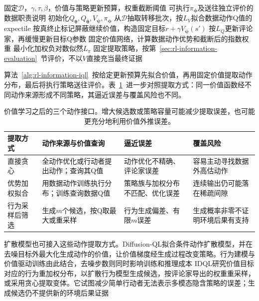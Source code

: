 \begin{algorithm}[固定经验上的IQL与策略提取]
  \label{alg:rl-information-iql}
  \begin{algorithmic}[1]
    \Require 固定$\mathcal D$，$\gamma,\tau,\beta$，价值与策略更新预算，权重截断阈值
    \Ensure 可执行$\pi_{\bm\phi}$及送往独立评价的数据职责说明
    \State 初始化$Q_{\bm\theta},Q_{\bar{\bm\theta}},V_{\bm\psi},\pi_{\bm\phi}$
      \State 从$\mathcal D$抽取转移批次，按$L_V$拟合数据动作Q值的expectile
      \State 按真终止标记屏蔽继续价值，构造固定目标$r+\gamma V_{\bm\psi}(s')$
      \State 按$L_Q$更新评论家，再缓慢更新目标Q参数
    \EndFor
      \State 固定价值网络，计算数据动作优势和截断后的指数权重
      \State 最小化加权负对数似然$L_\pi$
    \EndFor
    \State 固定提取策略，按第~\ref{sec:rl-information-evaluation}~节评价，不以$V$直接充当最终证据
  \end{algorithmic}
\end{algorithm}

算法~\ref{alg:rl-information-iql}~按给定更新预算先拟合价值，再用固定价值提取动作分布，最后将执行策略送往评价。表~\ref{tab:rl-information-extraction}~进一步对照提取方式：同一价值函数经不同动作来源形成不同策略，其逼近误差与覆盖风险也不同。

\begin{table}[htbp]
  \centering
  \small
  \begin{tabularx}{\linewidth}{p{26mm}XXX}
    \toprule
    提取方式 & 动作来源与价值查询 & 逼近误差 & 覆盖风险 \\
    \midrule
    直接贪心 & 全动作优化或行动者提出动作；查询其Q值 & 动作优化不精确、评论家误差 & 容易主动寻找数据外高估动作 \\
    优势加权拟合 & 用数据动作训练执行分布；训练查询数据Q值 & 策略族与加权分布不匹配、优化误差 & 连续输出仍可能落在稀疏间隙 \\
    行为采样后筛选 & 生成$m$个候选，按Q取最大或重采样 & 行为生成偏差、有限$m$误差 & 生成概率非零不证明环境后果有支持 \\
    \bottomrule
  \end{tabularx}
  \caption{价值学习之后的三个动作接口。增大候选数或策略容量可能减少提取误差，也可能更充分地利用价值外推误差。}
  \label{tab:rl-information-extraction}
\end{table}

扩散模型也可接入这些动作提取方式。Diffusion-QL拟合条件动作扩散模型，并在去噪目标外最大化生成动作的价值，让价值梯度经生成过程改变策略。行为建模与价值驱动训练由此结合，去噪步数则同时影响训练和推理成本
IDQL研究价值目标对应的行为重加权分布，以扩散行为模型生成候选，按评论家导出的权重重采样，或采用贪心提取变体。它试图减少简单行动者无法表示多模态隐含策略的误差；生成候选仍不提供新的环境后果证据

